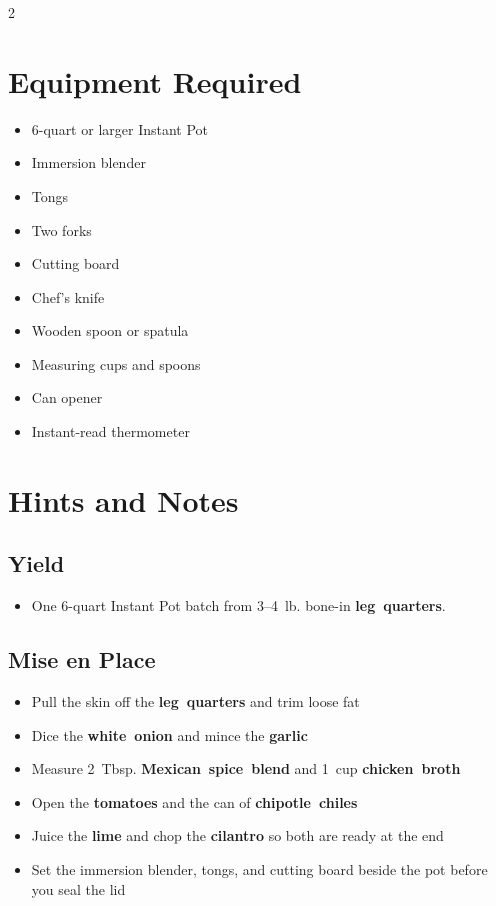 \documentclass[11pt,letterpaper]{article}
\begin{document}
{\small
\setlength{\columnsep}{20pt}
\setlength{\multicolsep}{6pt}
\begin{multicols}{2}
\setlength{\parindent}{0pt}
\setlength{\parskip}{4pt}

\section*{Equipment Required}
\begin{itemize}
    \item 6-quart or larger Instant Pot
    \item Immersion blender
    \item Tongs
    \item Two forks
    \item Cutting board
    \item Chef's knife
    \item Wooden spoon or spatula
    \item Measuring cups and spoons
    \item Can opener
    \item Instant-read thermometer
\end{itemize}

\section*{Hints and Notes}

\subsection*{Yield}
\begin{itemize}
    \item One 6-quart Instant Pot batch from 3--4~lb. bone-in \textbf{leg~quarters}.
\end{itemize}

\subsection*{Mise en Place}
\begin{itemize}
    \item Pull the skin off the \textbf{leg~quarters} and trim loose fat
    \item Dice the \textbf{white~onion} and mince the \textbf{garlic}
    \item Measure 2~Tbsp. \textbf{Mexican~spice~blend} and 1~cup \textbf{chicken~broth}
    \item Open the \textbf{tomatoes} and the can of \textbf{chipotle~chiles}
    \item Juice the \textbf{lime} and chop the \textbf{cilantro} so both are ready at the end
    \item Set the immersion blender, tongs, and cutting board beside the pot before you seal the lid
\end{itemize}


\end{multicols}}
\end{document}
